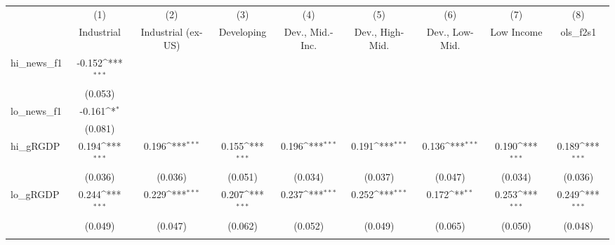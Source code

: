 {
\def\sym#1{\ifmmode^{#1}\else\(^{#1}\)\fi}
\begin{tabular}{l*{8}{c}}
\toprule
            &\multicolumn{1}{c}{(1)}&\multicolumn{1}{c}{(2)}&\multicolumn{1}{c}{(3)}&\multicolumn{1}{c}{(4)}&\multicolumn{1}{c}{(5)}&\multicolumn{1}{c}{(6)}&\multicolumn{1}{c}{(7)}&\multicolumn{1}{c}{(8)}\\
            &\multicolumn{1}{c}{Industrial}&\multicolumn{1}{c}{Industrial (ex-US)}&\multicolumn{1}{c}{Developing}&\multicolumn{1}{c}{Dev., Mid.-Inc.}&\multicolumn{1}{c}{Dev., High-Mid.}&\multicolumn{1}{c}{Dev., Low-Mid.}&\multicolumn{1}{c}{Low Income}&\multicolumn{1}{c}{ols\_f2s1}\\
\midrule
hi\_news\_f1  &      -0.152\sym{***}&                     &                     &                     &                     &                     &                     &                     \\
            &     (0.053)         &                     &                     &                     &                     &                     &                     &                     \\
\addlinespace
lo\_news\_f1  &      -0.161\sym{*}  &                     &                     &                     &                     &                     &                     &                     \\
            &     (0.081)         &                     &                     &                     &                     &                     &                     &                     \\
\addlinespace
hi\_gRGDP    &       0.194\sym{***}&       0.196\sym{***}&       0.155\sym{***}&       0.196\sym{***}&       0.191\sym{***}&       0.136\sym{***}&       0.190\sym{***}&       0.189\sym{***}\\
            &     (0.036)         &     (0.036)         &     (0.051)         &     (0.034)         &     (0.037)         &     (0.047)         &     (0.034)         &     (0.036)         \\
\addlinespace
lo\_gRGDP    &       0.244\sym{***}&       0.229\sym{***}&       0.207\sym{***}&       0.237\sym{***}&       0.252\sym{***}&       0.172\sym{**} &       0.253\sym{***}&       0.249\sym{***}\\
            &     (0.049)         &     (0.047)         &     (0.062)         &     (0.052)         &     (0.049)         &     (0.065)         &     (0.050)         &     (0.048)         \\
\addlinespace

\end{tabular}}

